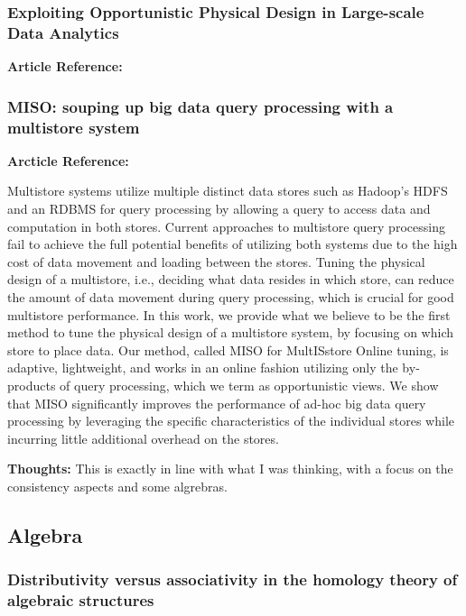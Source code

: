 \documentclass{article}
\begin{document}
\subsubsection{Exploiting Opportunistic Physical Design in Large-scale
               Data Analytics}

\textbf{Article Reference:} \cite{DBLP:journals/corr/abs-1303-6609}

\subsubsection{MISO: souping up big data query processing with a multistore system}

\textbf{Arcticle Reference:} \cite{LeFevre:2014:MSU:2588555.2588568}

Multistore systems utilize multiple distinct data stores such as Hadoop's HDFS and an RDBMS for query processing by allowing a query to access data and computation in both stores. Current approaches to multistore query processing fail to achieve the full potential benefits of utilizing both systems due to the high cost of data movement and loading between the stores. Tuning the physical design of a multistore, i.e., deciding what data resides in which store, can reduce the amount of data movement during query processing, which is crucial for good multistore performance. In this work, we provide what we believe to be the first method to tune the physical design of a multistore system, by focusing on which store to place data. Our method, called MISO for MultISstore Online tuning, is adaptive, lightweight, and works in an online fashion utilizing only the by-products of query processing, which we term as opportunistic views. We show that MISO significantly improves the performance of ad-hoc big data query processing by leveraging the specific characteristics of the individual stores while incurring little additional overhead on the stores.

\textbf{Thoughts:} This is exactly in line with what I was thinking, with a focus on the consistency aspects and some algrebras.

\subsection{Algebra}

\subsubsection{Distributivity versus associativity in the homology theory of algebraic structures}
\end{document}
